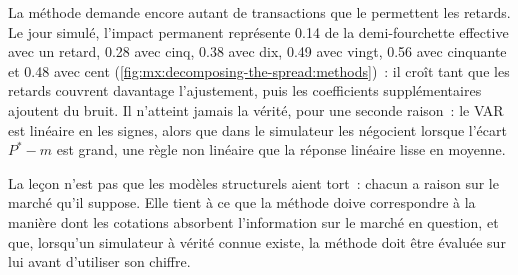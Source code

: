 La méthode demande encore autant de transactions que le permettent les retards. Le jour simulé, l'impact permanent représente 0.14 de la demi-fourchette effective avec un retard, 0.28 avec
cinq, 0.38 avec dix, 0.49 avec vingt, 0.56 avec cinquante et 0.48 avec cent (\cref{fig:mx:decomposing-the-spread:methods})~: il croît tant que les retards
couvrent davantage l'ajustement, puis les coefficients supplémentaires ajoutent du bruit. Il n'atteint jamais la vérité, pour une seconde raison~: le VAR est linéaire en les signes,
alors que dans le simulateur les  négocient lorsque l'écart $P^\ast-m$ est grand, une règle non linéaire que la réponse linéaire lisse en moyenne.

\begin{omfigure}

\label{fig:mx:decomposing-the-spread:methods}
\end{omfigure}

La leçon n'est pas que les modèles structurels aient tort~: chacun a raison sur le marché qu'il suppose. Elle tient à ce que la méthode doive correspondre à la manière dont les cotations absorbent
l'information sur le marché en question, et que, lorsqu'un simulateur à vérité connue existe, la méthode doit être évaluée sur lui avant d'utiliser son chiffre.

